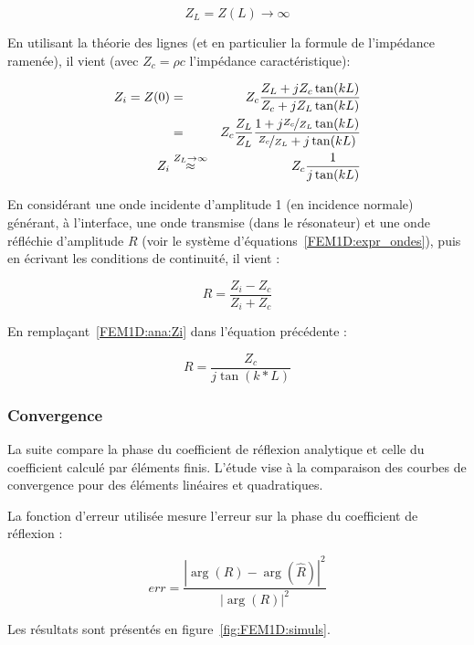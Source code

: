 \begin{equation}
	Z_L = Z(L) \rightarrow \infty \label{FEM1D:ana:ZL}
\end{equation}

En utilisant la théorie des lignes (et en particulier la formule de l'impédance ramenée), il vient (avec $Z_c =
\rho c$ l'impédance caractéristique):

\begin{eqnarray}
	Z_i = Z(0) 	& = & Z_c \frac{Z_L+jZ_c\tan(kL)}{Z_c + jZ_L\tan(kL)}\notag\\
			    & = & Z_c \frac{Z_L}{Z_L}\frac{1+j\nicefrac{Z_c}{Z_L}\tan(kL)}{\nicefrac{Z_c}{Z_L} + j\tan(kL)}\notag\\
		    Z_i & \overset{Z_L\rightarrow\infty}{\approx} & Z_c\frac{1}{j\tan(kL)}\label{FEM1D:ana:Zi}
\end{eqnarray}

En considérant une onde incidente d'amplitude 1 (en incidence normale) générant, à l'interface, une onde transmise (dans le
résonateur) et une onde réfléchie d'amplitude $R$ (voir le système d'équations~\eqref{FEM1D:expr_ondes}), puis en écrivant les
conditions de continuité, il vient :

\begin{equation*}
	R = \frac{Z_i-Z_c}{Z_i+Z_c}
\end{equation*}

En remplaçant~\eqref{FEM1D:ana:Zi} dans l'équation précédente :

\begin{equation}
	R = \frac{Z_c}{j\tan(k*L)}\label{FEM1D:ana:R}
\end{equation}

\subsubsection{Convergence}

La suite compare la phase du coefficient de réflexion analytique et celle du coefficient calculé par éléments
finis. L'étude vise à la comparaison des courbes de convergence pour des éléments linéaires et quadratiques.

La fonction d'erreur utilisée mesure l'erreur sur la phase du coefficient de réflexion :

\[
	err = \frac{\left|\arg(R) - \arg(\hat{R})\right|^2}{\left|\arg(R)\right|^2}
\]


Les résultats sont présentés en figure~\ref{fig:FEM1D:simuls}.

